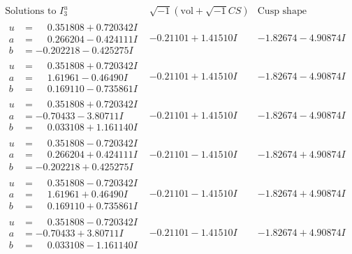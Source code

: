 \documentclass[1p]{elsarticle_modified}
\theoremstyle{definition}
\newcommand{\I}{\sqrt{-1}}
\begin{document}
$$\begin{array}{c|c|c}  
\text{Solutions to }I^u_{3}& \I (\text{vol} + \sqrt{-1}CS) & \text{Cusp shape}\\
 \hline 
\begin{aligned}
u &= \phantom{-}0.351808 + 0.720342 I \\
a &= \phantom{-}0.266204 - 0.424111 I \\
b &= -0.202218 - 0.425275 I\end{aligned}
 & -0.21101 + 1.41510 I & -1.82674 - 4.90874 I \\ \hline\begin{aligned}
u &= \phantom{-}0.351808 + 0.720342 I \\
a &= \phantom{-}1.61961 - 0.46490 I \\
b &= \phantom{-}0.169110 - 0.735861 I\end{aligned}
 & -0.21101 + 1.41510 I & -1.82674 - 4.90874 I \\ \hline\begin{aligned}
u &= \phantom{-}0.351808 + 0.720342 I \\
a &= -0.70433 - 3.80711 I \\
b &= \phantom{-}0.033108 + 1.161140 I\end{aligned}
 & -0.21101 + 1.41510 I & -1.82674 - 4.90874 I \\ \hline\begin{aligned}
u &= \phantom{-}0.351808 - 0.720342 I \\
a &= \phantom{-}0.266204 + 0.424111 I \\
b &= -0.202218 + 0.425275 I\end{aligned}
 & -0.21101 - 1.41510 I & -1.82674 + 4.90874 I \\ \hline\begin{aligned}
u &= \phantom{-}0.351808 - 0.720342 I \\
a &= \phantom{-}1.61961 + 0.46490 I \\
b &= \phantom{-}0.169110 + 0.735861 I\end{aligned}
 & -0.21101 - 1.41510 I & -1.82674 + 4.90874 I \\ \hline\begin{aligned}
u &= \phantom{-}0.351808 - 0.720342 I \\
a &= -0.70433 + 3.80711 I \\
b &= \phantom{-}0.033108 - 1.161140 I\end{aligned}
 & -0.21101 - 1.41510 I & -1.82674 + 4.90874 I \\ \hline\begin{aligned}

\end{aligned}
\end{array}$$
\end{document}

